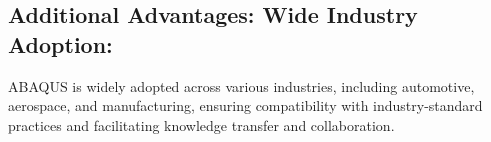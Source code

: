 \subsection{Additional Advantages: Wide Industry Adoption: }

ABAQUS is widely adopted across various industries, including automotive, aerospace, and manufacturing, ensuring compatibility with industry-standard practices and facilitating knowledge transfer and collaboration.


